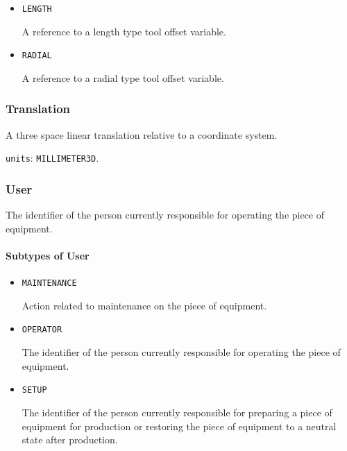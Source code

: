 \begin{itemize}

\item \texttt{LENGTH}


A reference to a length type tool offset variable.

\item \texttt{RADIAL}


A reference to a radial type tool offset variable.


\end{itemize}





\subsubsection{Translation}
\label{sec:Translation}



A three space linear translation relative to a coordinate system.



\texttt{units}: \texttt{MILLIMETER\textunderscore 3D}.


\subsubsection{User}
\label{sec:User}



The identifier of the person currently responsible for operating the piece of equipment.


\paragraph{Subtypes of User}\mbox{}
\label{sec:Subtypes of User}

\begin{itemize}

\item \texttt{MAINTENANCE}


Action related to maintenance on the piece of equipment.

\item \texttt{OPERATOR}


The identifier of the person currently responsible for operating the piece of equipment.

\item \texttt{SET\textunderscore UP}


The identifier of the person currently responsible for preparing a piece of equipment for production or restoring the piece of equipment to a neutral state after production.


\end{itemize}






